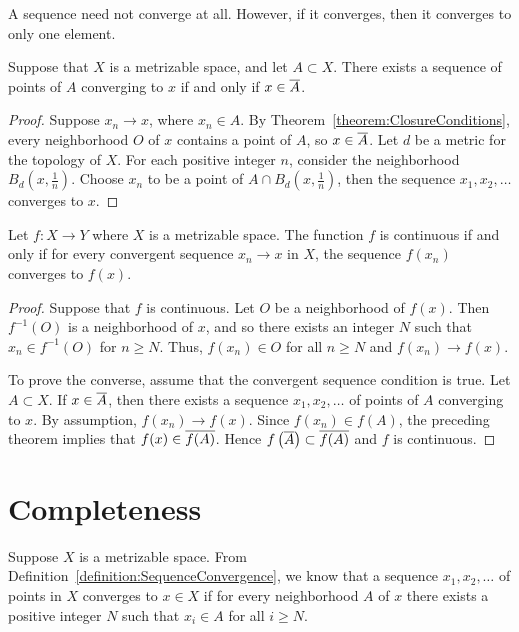 A sequence need not converge at all.
However, if it converges, then it converges to only one element.

\begin{theorem}
Suppose that $X$ is a metrizable space, and let $A \subset X$.
There exists a sequence of points of $A$ converging to $x$ if and only if $x \in \overline{A}$.
\end{theorem}
\begin{proof}
Suppose $x_n \rightarrow x$, where $x_n \in A$.
By Theorem~\ref{theorem:ClosureConditions}, every neighborhood $O$ of $x$ contains a point of $A$, so $x \in \overline{A}$.
Let $d$ be a metric for the topology of $X$.
For each positive integer $n$, consider the neighborhood $B_d \left( x, \frac{1}{n} \right)$.
Choose $x_n$ to be a point of $A \cap B_d \left( x, \frac{1}{n} \right)$,
then the sequence $x_1, x_2, \ldots$ converges to $x$.
\end{proof}

\begin{theorem}
Let $f: X \rightarrow Y$ where $X$ is a metrizable space.
The function $f$ is continuous if and only if for every convergent sequence $x_n \rightarrow x$ in $X$, the sequence $f(x_n)$ converges to $f(x)$.
\end{theorem}
\begin{proof}
Suppose that $f$ is continuous.
Let $O$ be a neighborhood of $f(x)$.
Then $f^{-1}(O)$ is a neighborhood of $x$, and so there exists an integer $N$ such that $x_n \in f^{-1}(O)$ for $n \geq N$.
Thus, $f(x_n) \in O$ for all $n \geq N$ and $f(x_n) \rightarrow f(x)$.

To prove the converse, assume that the convergent sequence condition is true.
Let $A \subset X$.
If $x \in \overline{A}$, then there exists a sequence $x_1, x_2, \ldots$ of points of $A$ converging to $x$.
By assumption, $f(x_n) \rightarrow f(x)$.
Since $f(x_n) \in f(A)$, the preceding theorem implies that $f(x) \in \overline{f(A)}$.
Hence $f \left( \overline{A} \right) \subset \overline{f(A)}$ and $f$ is continuous.
\end{proof}


\section{Completeness}

Suppose $X$ is a metrizable space.
From Definition~\ref{definition:SequenceConvergence}, we know that a sequence $x_1, x_2, \ldots$ of points in $X$ converges to $x \in X$ if for every neighborhood $A$ of $x$ there exists a positive integer $N$ such that $x_i \in A$ for all $i \geq N$.


